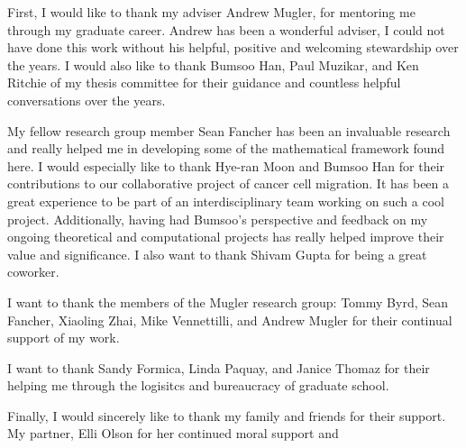 %
%
%
%


\begin{acknowledgments}
  First, I would like to thank my adviser Andrew Mugler, for mentoring me through my graduate career. Andrew has been a wonderful adviser, I could not have done this work without his helpful, positive and welcoming stewardship over the years. I would also like to thank Bumsoo Han, Paul Muzikar, and Ken Ritchie of my thesis committee for their guidance and countless helpful conversations over the years.

  My fellow research group member Sean Fancher has been an invaluable research and really helped me in developing some of the mathematical framework found here. I would especially like to thank Hye-ran Moon and Bumsoo Han for their contributions to our collaborative project of cancer cell migration. It has been a great experience to be part of an interdisciplinary team working on such a cool project. Additionally, having had Bumsoo's perspective and feedback on my ongoing theoretical and computational projects has really helped improve their value and significance. I also want to thank Shivam Gupta for being a great coworker.

  I want to thank the members of the Mugler research group: Tommy Byrd, Sean Fancher, Xiaoling Zhai, Mike Vennettilli, and Andrew Mugler for their continual support of my work.

  I want to thank Sandy Formica, Linda Paquay, and Janice Thomaz for their helping me through the logisitcs and bureaucracy of graduate school.

  Finally, I would sincerely like to thank my family and friends for their support. My partner, Elli Olson for her continued moral support and 
\end{acknowledgments}


